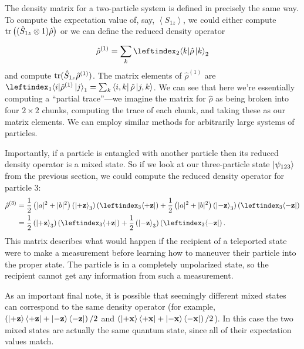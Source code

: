 \documentclass[../p116main.tex]{subfiles}
\begin{document}
The density matrix for a two-particle system is defined in precisely the same way.
To compute the expectation value of, say, $\left< S_{1z} \right>$, we could either compute $\operatorname{tr} \big( (\hat S_{1z} \otimes 1) \hat \rho \big)$ or we can define the reduced density operator
\[ \hat \rho^{(1)} = \sum_{k}^{} \leftindex_2{\bra{k}} \hat \rho \ket{k}_2 \]
and compute $\operatorname{tr} (\hat S_{1z} \hat \rho^{(1)})$.
The matrix elements of $\hat \rho^{(1)}$ are $\leftindex_1{\bra{i}} \hat \rho^{(1)} \ket{j}_1 = \sum_{k}^{} \bra{i,k} \hat \rho \ket{j,k}$.
We can see that here we're essentially computing a ``partial trace''---we imagine the matrix for $\hat \rho$ as being broken into four $2 \times 2$ chunks, computing the trace of each chunk, and taking these as our matrix elements.
We can employ similar methods for arbitrarily large systems of particles.

Importantly, if a particle is entangled with another particle then its reduced density operator is a mixed state.
So if we look at our three-particle state $\left| \psi_{123} \right>$ from the previous section, we could compute the reduced density operator for particle 3:
\begin{align*}
    \hat \rho^{(3)} &= \frac{1}{2} \left( |a|^2 + |b|^2 \right) \left( \ket{+\mbf{z}}_3 \right) \left( \leftindex_3{\bra{+\mbf{z}}} \right) + \frac{1}{2} \left( |a|^2 + |b|^2 \right) \left( \ket{-\mbf{z}}_3 \right) \left( \leftindex_3{\bra{-\mbf{z}}} \right) \\
    &= \frac{1}{2} \left( \ket{+\mbf{z}}_3 \right) \left( \leftindex_3{\bra{+\mbf{z}}} \right) + \frac{1}{2} \left( \ket{-\mbf{z}}_3 \right) \left( \leftindex_3{\bra{-\mbf{z}}} \right).
\end{align*}
This matrix describes what would happen if the recipient of a teleported state were to make a measurement before learning how to maneuver their particle into the proper state.
The particle is in a completely unpolarized state, so the recipient cannot get any information from such a measurement.

As an important final note, it is possible that seemingly different mixed states can correspond to the same density operator (for example, $\left( \left| +\mathbf{z} \right> \left< +\mathbf{z} \right| + \left| -\mathbf{z} \right> \left< -\mathbf{z} \right| \right) / 2$ and $\left( \left| +\mathbf{x} \right> \left< +\mathbf{x} \right| + \left| -\mathbf{x} \right> \left< -\mathbf{x} \right| \right) / 2$).
In this case the two mixed states are actually the same quantum state, since all of their expectation values match.
\end{document}
